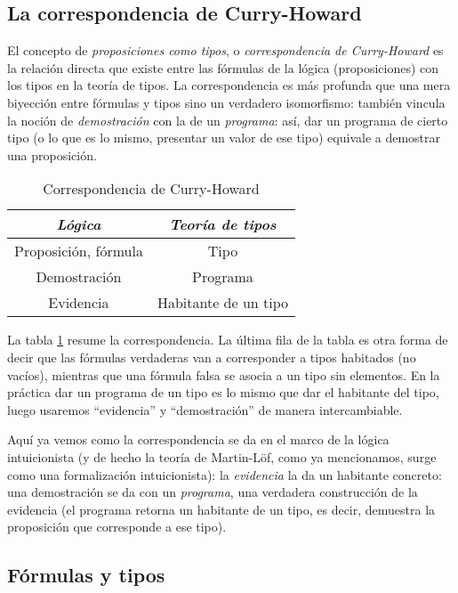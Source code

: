 \documentclass[11pt]{article} %
\begin{document}
\subsection{La correspondencia de Curry-Howard}
El concepto de \textit{proposiciones como tipos}, o \textit{correspondencia de Curry-Howard} es la relación directa que existe entre las fórmulas de la lógica (proposiciones) con los tipos en la teoría de tipos. La correspondencia es más profunda que una mera biyección entre fórmulas y tipos sino un verdadero isomorfismo: también vincula la noción de \textit{demostración} con la de un \textit{programa}: así, dar un programa de cierto tipo (o lo que es lo mismo, presentar un valor de ese tipo) equivale a demostrar una proposición.
\begin{table}[ht]
    \centering
    \begin{tabular}{|c|c|}
    \hline
    \textit{\textbf{Lógica}} & \textit{\textbf{Teoría de tipos}} \\ \hline
    Proposición, fórmula     & Tipo                              \\ \hline
    Demostración             & Programa                          \\ \hline
    Evidencia                & Habitante de un tipo              \\ \hline
    \end{tabular}
    \caption{Correspondencia de Curry-Howard}
    \label{tab:cwi}
    \end{table}

La tabla \ref{tab:cwi} resume la correspondencia. La última fila de la tabla es otra forma de decir que las fórmulas verdaderas van a corresponder a tipos habitados (no vacíos), mientras que una fórmula falsa se asocia a un tipo sin elementos. En la práctica dar un programa de un tipo es lo mismo que dar el habitante del tipo, luego usaremos ``evidencia'' y ``demostración'' de manera intercambiable.

Aquí ya vemos como la correspondencia se da en el marco de la lógica intuicionista (y de hecho la teoría de Martin-Löf, como ya mencionamos, surge como una formalización intuicionista): la \textit{evidencia} la da un habitante concreto: una demostración se da con un \textit{programa}, una verdadera construcción de la evidencia (el programa retorna un habitante de un tipo, es decir, demuestra la proposición que corresponde a ese tipo). 

\subsection{Fórmulas y tipos}
\end{document}
